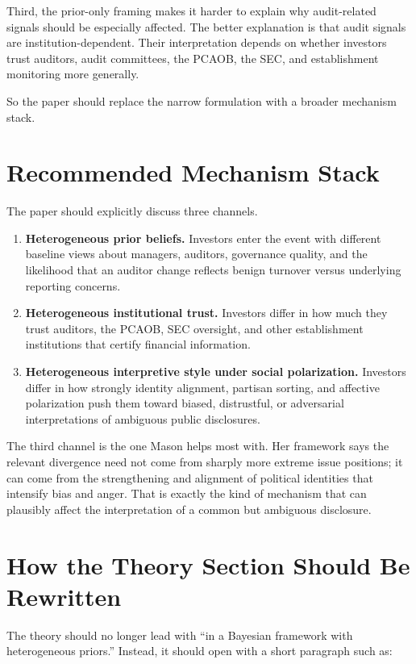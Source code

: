 \documentclass[12pt]{article}
\begin{document}
Third, the prior-only framing makes it harder to explain why audit-related signals should be especially affected. The better explanation is that audit signals are institution-dependent. Their interpretation depends on whether investors trust auditors, audit committees, the PCAOB, the SEC, and establishment monitoring more generally.

So the paper should replace the narrow formulation with a broader mechanism stack.

\section{Recommended Mechanism Stack}

The paper should explicitly discuss three channels.

\begin{enumerate}[label=\textbf{C\arabic*.}]
    \item \textbf{Heterogeneous prior beliefs.} Investors enter the event with different baseline views about managers, auditors, governance quality, and the likelihood that an auditor change reflects benign turnover versus underlying reporting concerns.
    \item \textbf{Heterogeneous institutional trust.} Investors differ in how much they trust auditors, the PCAOB, SEC oversight, and other establishment institutions that certify financial information.
    \item \textbf{Heterogeneous interpretive style under social polarization.} Investors differ in how strongly identity alignment, partisan sorting, and affective polarization push them toward biased, distrustful, or adversarial interpretations of ambiguous public disclosures.
\end{enumerate}

The third channel is the one Mason helps most with. Her framework says the relevant divergence need not come from sharply more extreme issue positions; it can come from the strengthening and alignment of political identities that intensify bias and anger. That is exactly the kind of mechanism that can plausibly affect the interpretation of a common but ambiguous disclosure.

\section{How the Theory Section Should Be Rewritten}

The theory should no longer lead with ``in a Bayesian framework with heterogeneous priors.'' Instead, it should open with a short paragraph such as:
\end{document}
